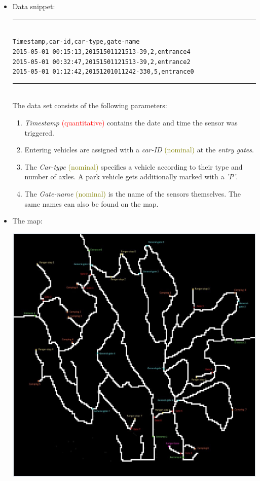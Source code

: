 \documentclass{article}
\begin{document}
\begin{itemize}
\item Data snippet:\\
\noindent\rule{9.3cm}{1pt}\\
\texttt{Timestamp,car-id,car-type,gate-name}\\
\texttt{2015-05-01 00:15:13,20151501121513-39,2,entrance4}\\
\texttt{2015-05-01 00:32:47,20151501121513-39,2,entrance2}\\
\texttt{2015-05-01 01:12:42,20151201011242-330,5,entrance0}\\
\noindent\rule{9.3cm}{1pt}\\

The data set consists of the following parameters:

	\begin{enumerate}
	\item \textit{Timestamp} \textcolor{red}{(quantitative)} contains the date and time the sensor was triggered.
	\item Entering vehicles are assigned with a \textit{car-ID} \textcolor{olive}{(nominal)} at the \textit{entry gates}.
	\item The \textit{Car-type} \textcolor{olive}{(nominal)} specifies a vehicle according to their type and number of axles. A park vehicle gets additionally marked with a \textit{'P'}.
	\item The \textit{Gate-name} \textcolor{olive}{(nominal)} is the name of the sensors themselves. The same names can also be found on the map.
	\end{enumerate}

\item The map:
	
	\begin{center}
	\includegraphics[scale=0.3]{Lekagul_Roadways_labeled_v2.jpg}	
	\end{center}
	

\end{itemize}
\end{document}

